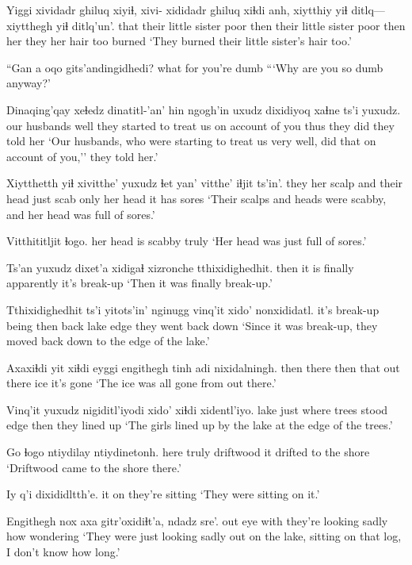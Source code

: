 \documentclass[12pt]{article}
\begin{document}
\gll Yiggi xividadr ghiluq xiyiɬ, xivi- xididadr ghiluq xiɬdi anh, {xiytthiy yiɬ ditlq---} xiytthegh yiɬ ditlq'un'.
that {their little sister} poor then {} {their little sister} poor then her {} {they her hair} too {burned}
\glt `They burned their little sister's hair too.'
\glend

\gll ``Gan a oqo gits'andingidhedi?
what {} for {you're dumb}
\glt ```Why are you so dumb anyway?'
\glend

\gll Dinaqing'qay xeɬedz {dinatitl-'an' hin} ngogh'in uxudz dixidiyoq xaɬne ts'i yuxudz.
{our husbands} well {they started to treat us} {on account of you} thus {they did} {they told her} 
\glt `Our husbands, who were starting to treat us very well, did that on account of you,'' they told her.'
\glend

\gll Xiytthetth yiɬ xivitthe' yuxudz ɬet yan' vitthe' iɬjit ts'in'.
{they her scalp} and {their head} just scab only {her head} {it has sores}
\glt `Their scalps and heads were scabby, and her head was full of sores.'
\glend

\gll Vitthititljit ɬogo.
{her head is scabby} truly
\glt `Her head was just full of sores.'
\glend

\gll Ts'an yuxudz dixet'a xidigaɬ xizronche tthixidighedhit. 
then {} {it is} finally apparently {it's break-up}
\glt `Then it was finally break-up.'
\glend

\gll Tthixidighedhit ts'i yitots'in' nginugg vinq'it xido' nonxididatl.
{it's break-up} being then back lake edge {they went back down}
\glt `Since it was break-up, they moved back down to the edge of the lake.'
\glend

\gll Axaxiɬdi yit xiɬdi eyggi engithegh tinh {adi nixidalningh}.
then there then that {out there} ice {it's gone}
\glt `The ice was all gone from out there.'
\glend

\gll Vinq'it yuxudz nigiditl'iyodi xido' xiɬdi xidentl'iyo.
lake   just {where trees stood} edge then {they lined up}
\glt `The girls lined up by the lake at the edge of the trees.'
\glend

\gll Go ɬogo ntiydilay ntiydinetonh.
here truly driftwood {it drifted to the shore}
\glt `Driftwood came to the shore there.'
\glend

\gll Iy q'i dixididltth'e.
it on    {they're sitting}
\glt `They were sitting on it.'
\glend

\gll Engithegh nox axa gitr'oxidiɬt'a, ndadz sre'.
out  eye with {they're looking sadly} how wondering
\glt `They were just looking sadly out on the lake, sitting on that log, I don't know how long.'
\glend
\end{document}

